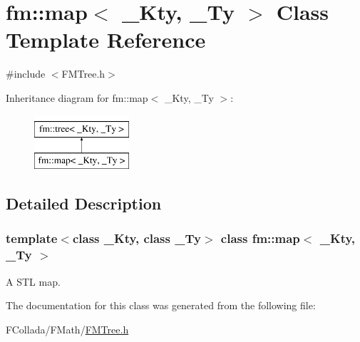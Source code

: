 \hypertarget{classfm_1_1map}{
\section{fm::map$<$ \_\-Kty, \_\-Ty $>$ Class Template Reference}
\label{classfm_1_1map}
}


{\ttfamily \#include $<$FMTree.h$>$}

Inheritance diagram for fm::map$<$ \_\-Kty, \_\-Ty $>$:\begin{figure}[H]
\begin{center}
\leavevmode
\includegraphics[height=2.000000cm]{classfm_1_1map}
\end{center}
\end{figure}


\subsection{Detailed Description}
\subsubsection*{template$<$class \_\-Kty, class \_\-Ty$>$ class fm::map$<$ \_\-Kty, \_\-Ty $>$}

A STL map. 

The documentation for this class was generated from the following file:\begin{DoxyCompactItemize}
\item 
FCollada/FMath/\hyperlink{FMTree_8h}{FMTree.h}\end{DoxyCompactItemize}
